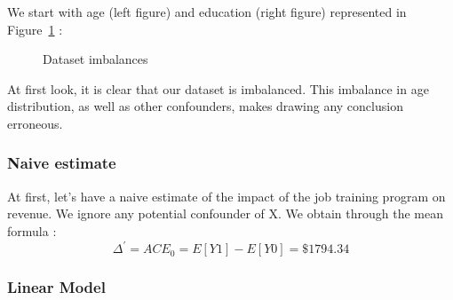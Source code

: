 \documentclass{article}
\begin{document}
We start with age (left figure) and education (right figure) represented in Figure~\ref{ref:imbalance} :

\begin{figure}[!tbp]
  \centering
  \hfill
  \caption{Dataset imbalances}
  \label{ref:imbalance}
\end{figure}



At first look, it is clear that our dataset is imbalanced. This imbalance in age distribution, as well as other confounders, makes drawing any conclusion erroneous. 



\subsubsection{Naive estimate}

At first, let's have a naive estimate of the impact of the job training program on revenue.
We ignore any potential confounder of X. We obtain through the mean formula :
$$ \Delta^{'} = ACE_{0} = E[Y1] - E[Y0]= \$ 1794.34 $$


\subsubsection{Linear Model}
\end{document}
